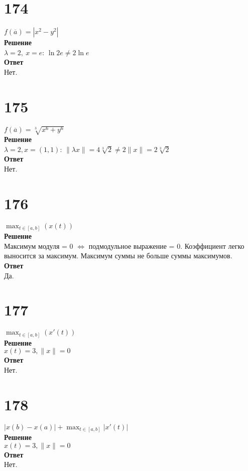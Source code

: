 \documentclass[a4paper]{article}
\begin{document}
\section*{174}
$f( \overline{a}) = |x^2 - y^2| $\\
\textbf{Решение}\\
$\lambda = 2,\ x = e$:  $\ln 2e \neq 2\ln e$\\
\textbf{Ответ}\\Нет.

\section*{175}
$f(\overline{a}) = \sqrt[3]{x^6 + y^6} $\\
\textbf{Решение}\\
$\lambda = 2, x = (1, 1)$: $\|\lambda x\| = 4\sqrt[3]{2} \neq 2\|x\| = 2\sqrt[3]{2}$\\
\textbf{Ответ}\\Нет.

\section*{176}
$\max_{t\in [a, b]} (x(t))$\\
\textbf{Решение}\\
Максимум модуля = 0 $\Leftrightarrow$ подмодульное выражение = 0. Коэффициент легко выносится за максимум. Максимум суммы не больше суммы максимумов.\\
\textbf{Ответ}\\Да.

\section*{177}
$\max_{t\in [a, b]} (x'(t))$\\
\textbf{Решение}\\
$x(t) = 3, \|x\| = 0$\\
\textbf{Ответ}\\Нет.

\section*{178}
$|x(b) - x(a)| + \max_{t\in [a, b]} |x'(t)|$\\
\textbf{Решение}\\
$x(t) = 3, \|x\| = 0$\\
\textbf{Ответ}\\Нет.
\end{document}
